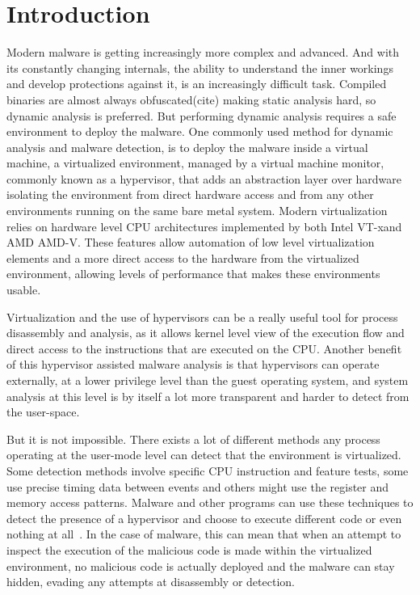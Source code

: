 \section{Introduction}\label{s:intro}

Modern malware is getting increasingly more complex and advanced.
And with its constantly changing internals, the ability to understand the inner workings and develop protections against it, is an increasingly difficult task. 
Compiled binaries are almost always obfuscated(cite) making static analysis hard, so dynamic analysis is preferred. But performing dynamic analysis requires a safe environment 
to deploy the malware. One commonly used method for dynamic analysis and malware detection, is to deploy the malware inside a virtual machine, a virtualized environment, managed by a virtual machine monitor, 
commonly known as a hypervisor, that adds an abstraction layer over hardware isolating the environment from direct hardware access and from any other environments running on the same bare metal system. 
Modern virtualization relies on hardware level CPU architectures implemented by both Intel\textsuperscript{\tiny\textregistered} VT-x\texttrademark and AMD\textsuperscript{\tiny\textregistered} AMD-V\texttrademark. 
These features allow automation of low level virtualization elements and a more direct access to the hardware from the virtualized environment, allowing levels of performance that makes these environments usable.

Virtualization and the use of hypervisors can be a really useful tool for process disassembly and analysis, as it allows kernel level view of the execution flow and direct access to the instructions that are executed on the CPU.
Another benefit of this hypervisor assisted malware analysis is that hypervisors can operate externally, at a lower privilege level than the guest operating system, 
and system analysis at this level is by itself a lot more transparent and harder to detect from the user-space.

But it is not impossible. There exists a lot of different methods any process operating at the user-mode level can detect that the environment is virtualized. 
Some detection methods involve specific CPU instruction and feature tests, some use precise timing data between events and others might use the register and memory access patterns. 
Malware and other programs can use these techniques to detect the presence of a hypervisor and choose to execute different code or even nothing at all~\cite{10.1109/TIFS.2020.2976559}. 
In the case of malware, this can mean that when an attempt to inspect the execution of the malicious code is made within the virtualized environment, 
no malicious code is actually deployed and the malware can stay hidden, evading any attempts at disassembly or detection.

